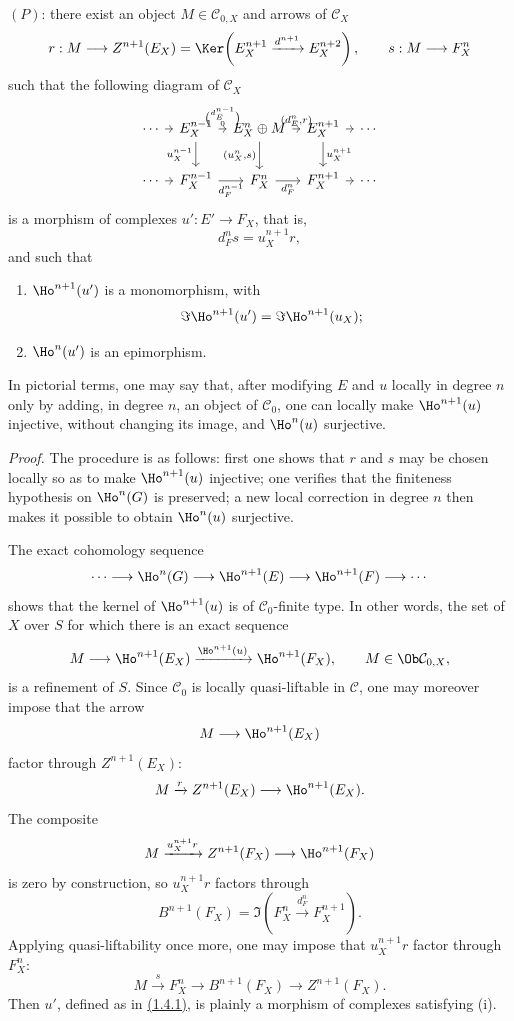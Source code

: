 \((P)\): there exist an object \(M\in\mathcal C_{0,X}\) and arrows of \(\mathcal C_X\)
\[
  r:M\longrightarrow Z^{n+1}(E_X)=
  \Ker\!\left(E_X^{n+1}\xrightarrow{d^{n+1}}E_X^{n+2}\right),
  \qquad
  s:M\longrightarrow F_X^n
\]
such that the following diagram of \(\mathcal C_X\)
\[
\begin{tikzcd}[column sep=tiny]
\cdots \arrow[r] & E_X^{n-1}
 \arrow[r,"{\binom{d_E^{n-1}}{0}}"]
 \arrow[d,"u_X^{n-1}"'] &
E_X^n\oplus M
 \arrow[r,"{(d_E^n,r)}"]
 \arrow[d,"{(u_X^n,s)}"'] &
E_X^{n+1} \arrow[r] \arrow[d,"u_X^{n+1}"] &
\cdots\\
\cdots \arrow[r] & F_X^{n-1} \arrow[r,"d_F^{n-1}"'] &
F_X^n \arrow[r,"d_F^n"'] &
F_X^{n+1} \arrow[r] &
\cdots
\end{tikzcd}
\]
is a morphism of complexes \(u':E'\to F_X\), that is,
\[
  d_F^n s=u_X^{n+1}r,
\]
and such that
\begin{enumerate}[label=(\roman*)]
\item \(\Ho^{n+1}(u')\) is a monomorphism, with
\[
  \Im\Ho^{n+1}(u')=\Im\Ho^{n+1}(u_X);
\]
\item \(\Ho^n(u')\) is an epimorphism.
\end{enumerate}

In pictorial terms, one may say that, after modifying \(E\) and \(u\) locally in degree \(n\) only by adding, in degree \(n\), an object of \(\mathcal C_0\), one can locally make \(\Ho^{n+1}(u)\) injective, without changing its image, and \(\Ho^n(u)\) surjective.

\emph{Proof.} The procedure is as follows: first one shows that \(r\) and \(s\) may be chosen locally so as to make \(\Ho^{n+1}(u)\) injective; one verifies that the finiteness hypothesis on \(\Ho^n(G)\) is preserved; a new local correction in degree \(n\) then makes it possible to obtain \(\Ho^n(u)\) surjective.

The exact cohomology sequence
\[
  \cdots\longrightarrow \Ho^n(G)\longrightarrow
  \Ho^{n+1}(E)\longrightarrow
  \Ho^{n+1}(F)\longrightarrow \cdots
\]
shows that the kernel of \(\Ho^{n+1}(u)\) is of \(\mathcal C_0\)-finite type. In other words, the set of \(X\) over \(S\) for which there is an exact sequence
\[
  M\longrightarrow \Ho^{n+1}(E_X)
  \xrightarrow{\Ho^{n+1}(u)}
  \Ho^{n+1}(F_X),
  \qquad M\in\Ob\mathcal C_{0,X},
\]
is a refinement of \(S\). Since \(\mathcal C_0\) is locally quasi-liftable in \(\mathcal C\), one may moreover impose that the arrow
\[
  M\longrightarrow \Ho^{n+1}(E_X)
\]
factor through \(Z^{n+1}(E_X)\):
\[
  M\xrightarrow{r} Z^{n+1}(E_X)\longrightarrow \Ho^{n+1}(E_X).
\]
The composite
\[
  M\xrightarrow{u_X^{n+1}r} Z^{n+1}(F_X)\longrightarrow \Ho^{n+1}(F_X)
\]
is zero by construction, so \(u_X^{n+1}r\) factors through
\[
  B^{n+1}(F_X)=\Im\!\left(F_X^n\xrightarrow{d_F^n}F_X^{n+1}\right).
\]
Applying quasi-liftability once more, one may impose that \(u_X^{n+1}r\) factor through \(F_X^n\):
\[
  M\xrightarrow{s}F_X^n\longrightarrow B^{n+1}(F_X)\longrightarrow Z^{n+1}(F_X).
\]
Then \(u'\), defined as in \hyperlink{sga6.e01.prop.1-4-1}{(1.4.1)}, is plainly a morphism of complexes satisfying (i).

